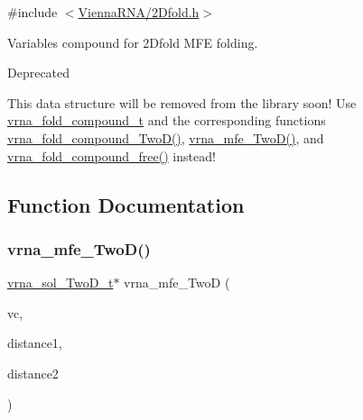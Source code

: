 {\ttfamily \#include $<$\mbox{\hyperlink{2_dfold_8h}{Vienna\+R\+N\+A/2\+Dfold.\+h}}$>$}



Variables compound for 2\+Dfold M\+FE folding. 

\begin{DoxyRefDesc}{Deprecated}
\item[\mbox{\hyperlink{deprecated__deprecated000001}{Deprecated}}]This data structure will be removed from the library soon! Use \mbox{\hyperlink{group__fold__compound_ga1b0cef17fd40466cef5968eaeeff6166}{vrna\+\_\+fold\+\_\+compound\+\_\+t}} and the corresponding functions \mbox{\hyperlink{group__fold__compound_ga9d24b196753b4f9f03774f11661510f5}{vrna\+\_\+fold\+\_\+compound\+\_\+\+Two\+D()}}, \mbox{\hyperlink{group__kl__neighborhood__mfe_ga243c288b463147352829df04de6a2f77}{vrna\+\_\+mfe\+\_\+\+Two\+D()}}, and \mbox{\hyperlink{group__fold__compound_gadded6039d63f5d6509836e20321534ad}{vrna\+\_\+fold\+\_\+compound\+\_\+free()}} instead! \end{DoxyRefDesc}


\subsection{Function Documentation}
\mbox{\label{group__kl__neighborhood__mfe_ga243c288b463147352829df04de6a2f77}} 
\subsubsection{\texorpdfstring{vrna\+\_\+mfe\+\_\+\+Two\+D()}{vrna\_mfe\_TwoD()}}
{\footnotesize\ttfamily \mbox{\hyperlink{group__kl__neighborhood__mfe_structvrna__sol___two_d__t}{vrna\+\_\+sol\+\_\+\+Two\+D\+\_\+t}}$\ast$ vrna\+\_\+mfe\+\_\+\+TwoD (\begin{DoxyParamCaption}\item[{\mbox{\hyperlink{group__fold__compound_ga1b0cef17fd40466cef5968eaeeff6166}{vrna\+\_\+fold\+\_\+compound\+\_\+t}} $\ast$}]{vc,  }\item[{int}]{distance1,  }\item[{int}]{distance2 }\end{DoxyParamCaption})}



